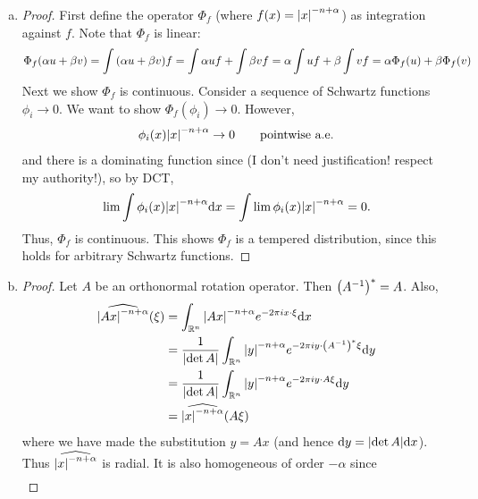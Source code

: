 \documentclass{article} %
\theoremstyle{plain}
\def\Rl{\mathbb{R}}
\numberwithin{equation}{section} %
\numberwithin{figure}{section} %
\numberwithin{table}{section} %
\begin{document}
\begin{enumerate}[(a)]
    \item\begin{proof}
        First define the operator $\Phi_f$ (where $f(x) = \abs{x}^{-n+\alpha}$) as integration against $f$.  Note that $\Phi_f$ is linear:
        \begin{align*}
            \Phi_f(\alpha u + \beta v) = \int \qty(\alpha u + \beta v)f = \int \alpha u f + \int \beta v f = \alpha \int u f + \beta \int v f = \alpha\Phi_f(u) + \beta\Phi_f(v)
        \end{align*}
        Next we show $\Phi_f$ is continuous.  Consider a sequence of Schwartz functions $\phi_i \rightarrow 0$.  We want to show $\Phi_f(\phi_i) \rightarrow 0$.  However,
        \begin{align*}
            \phi_i(x)\abs{x}^{-n + \alpha} \rightarrow 0 \qquad \text{pointwise a.e.}
        \end{align*}
        and there is a dominating function since (I don't need justification! respect my authority!), so by DCT,
        \begin{align*}
            \lim \int \phi_i(x)\abs{x}^{-n + \alpha}\dd x = \int\lim \phi_i(x)\abs{x}^{-n + \alpha} = 0.
        \end{align*}
        Thus, $\Phi_f$ is continuous.  This shows $\Phi_f$ is a tempered distribution, since this holds for arbitrary Schwartz functions.
    \end{proof}
    \item\begin{proof}
        Let $A$ be an orthonormal rotation operator.  Then $\qty(A^{-1})^* = A$.  Also,
        \begin{align*}
            \widehat{\abs{Ax}^{-n + \alpha}}(\xi) &= \int_{\Rl^n} \abs{Ax}^{-n+\alpha}e^{-2\pi i x\cdot \xi}\dd x \\
            &= \frac{1}{\abs{\det A}}\int_{\Rl^n}\abs{y}^{-n +\alpha}e^{-2\pi i y\cdot \qty(A^{-1})^*\xi} \dd y \\
            &= \frac{1}{\abs{\det A}}\int_{\Rl^n}\abs{y}^{-n +\alpha}e^{-2\pi i y\cdot A \xi} \dd y \\
            &= \widehat{\abs{x}^{-n + \alpha}}(A\xi)
        \end{align*}
        where we have made the substitution $y = Ax$ (and hence $\dd y = \abs{\det A}\dd x$).  Thus $\widehat{\abs{x}^{-n + \alpha}}$ is radial.  It is also homogeneous of order $-\alpha$ since
        \begin{align*}

\end{align*}
\end{proof}
\end{enumerate}
\end{document}
